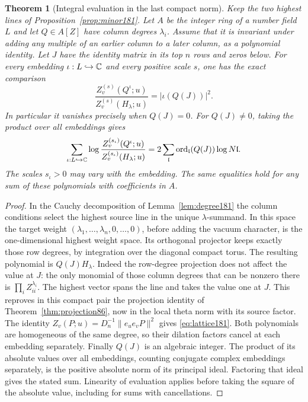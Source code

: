 \documentclass[a4paper,11pt]{article}
\newtheorem{theorem}[proposition]{Theorem}
\theoremstyle{definition}
\theoremstyle{remark}
\numberwithin{equation}{section}
\begin{document}
\begin{theorem}[Integral evaluation in the last compact norm]
\label{thm:integral181}
Keep the two highest lines of Proposition~\ref{prop:minor181}.
Let \(A\) be the integer ring of a number field \(L\) and let
\(Q\in A[Z]\) have column degrees \(\lambda_i\). Assume that it
is invariant under adding any multiple of an earlier column
to a later column, as a polynomial identity. Let \(J\) have
the identity matrix in its top \(n\) rows and zeros below.
For every embedding \(\iota:L\hookrightarrow\mathbb C\) and
every positive scale \(s\), one has the exact comparison
\begin{equation}
   \frac{ Z_v^{(s)}(Q^\iota;u)}
        { Z_v^{(s)}(H_\lambda;u)}
      = |\iota(Q(J))|^2 .                            \label{eq:lattice181}
\end{equation}
In particular it vanishes precisely when \(Q(J)=0\). For
\(Q(J)\ne0\), taking the product over all embeddings gives
\[
 \sum_{\iota:L\hookrightarrow\mathbb C}
 \log\frac{Z_v^{(s_\iota)}(Q^\iota;u)}
               {Z_v^{(s_\iota)}(H_\lambda;u)}
      = 2\sum_{\mathfrak l}
           \operatorname{ord}_{\mathfrak l}(Q(J))\log N\mathfrak l .
\]
The scales \(s_\iota>0\) may vary with the embedding.
The same equalities hold for any sum of these polynomials
with coefficients in \(A\).
\end{theorem}
\begin{proof}
In the Cauchy decomposition of Lemma~\ref{lem:degree181}
the column conditions select the highest source line in the
unique \(\lambda\)-summand. In this space the target weight
\((\lambda_1,\ldots,\lambda_n,0,\ldots,0)\), before adding
the vacuum character, is the one-dimensional highest
weight space. Its orthogonal projector keeps exactly those
row degrees, by integration over the diagonal compact torus.
The resulting polynomial is \(Q(J)H_\lambda\). Indeed the
row-degree projection does not affect the value at \(J\):
the only monomial of those column degrees that can be
nonzero there is \(\prod_i Z_{ii}^{\lambda_i}\). The
highest vector spans the line and takes the value one at
\(J\). This reproves in this compact pair the projection
identity of Theorem~\ref{thm:projection86}, now in the
local theta norm with its source factor. The identity
\(Z_v(P;u)=D_n^{-1}\|e_u e_vP\|^2\) gives
\eqref{eq:lattice181}. Both polynomials are homogeneous
of the same degree, so their dilation factors cancel at
each embedding separately. Finally \(Q(J)\) is an algebraic
integer. The product of its absolute values over all
embeddings, counting conjugate complex embeddings separately,
is the positive absolute norm of its principal ideal.
Factoring that ideal gives the stated sum. Linearity of
evaluation applies before taking the square of the absolute
value, including for sums with cancellations.
\end{proof}
\end{document}
